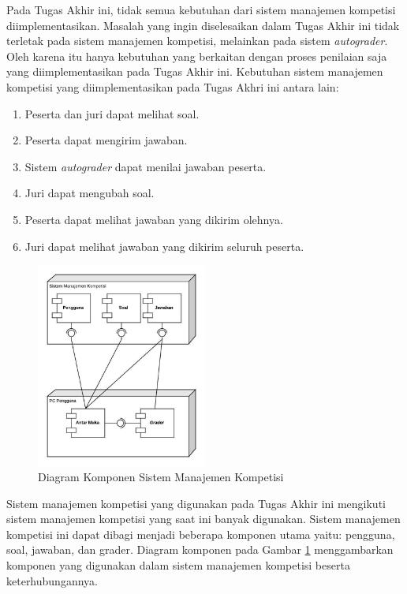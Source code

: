 \par Pada Tugas Akhir ini, tidak semua kebutuhan dari sistem manajemen kompetisi diimplementasikan. Masalah yang ingin diselesaikan dalam Tugas Akhir ini tidak terletak pada sistem manajemen kompetisi, melainkan pada sistem \textit{autograder}. Oleh karena itu hanya kebutuhan yang berkaitan dengan proses penilaian saja yang diimplementasikan pada Tugas Akhir ini. Kebutuhan sistem manajemen kompetisi yang diimplementasikan pada Tugas Akhri ini antara lain:

\begin{enumerate}
    \item Peserta dan juri dapat melihat soal.
    \item Peserta dapat mengirim jawaban.
    \item Sistem \textit{autograder} dapat menilai jawaban peserta.
    \item Juri dapat mengubah soal.
    \item Peserta dapat melihat jawaban yang dikirim olehnya.
    \item Juri dapat melihat jawaban yang dikirim seluruh peserta.
\end{enumerate}

\begin{figure}[ht!]
    \centering
    \includegraphics[width=0.5\textwidth]{images/oj-components}
    \caption{Diagram Komponen Sistem Manajemen Kompetisi}
    \label{fig:oj-components}
\end{figure}

\par Sistem manajemen kompetisi yang digunakan pada Tugas Akhir ini mengikuti sistem manajemen kompetisi yang saat ini banyak digunakan. Sistem manajemen kompetisi ini dapat dibagi menjadi beberapa komponen utama yaitu: pengguna, soal, jawaban, dan grader. Diagram komponen pada Gambar \ref{fig:oj-components} menggambarkan komponen yang digunakan dalam sistem manajemen kompetisi beserta keterhubungannya.


